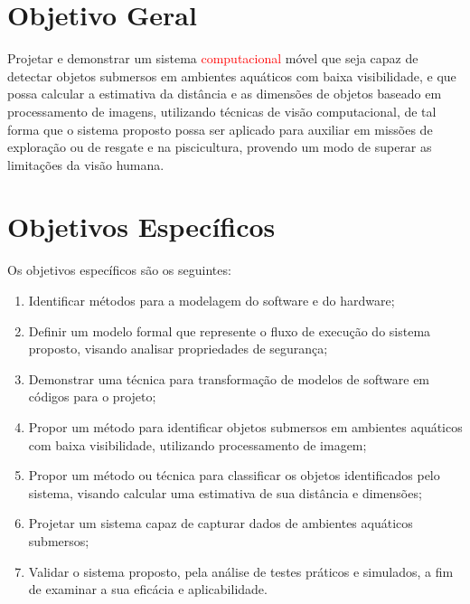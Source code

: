 

\section{Objetivo Geral}
Projetar e demonstrar um sistema \textcolor{red}{computacional} móvel que seja capaz de detectar objetos submersos em ambientes aquáticos com baixa visibilidade, e que possa calcular a estimativa da distância e as dimensões de objetos baseado em processamento de imagens, utilizando técnicas de visão computacional, de tal forma que o sistema proposto possa ser aplicado para auxiliar em missões de exploração ou de resgate e na piscicultura, provendo um modo de superar as limitações da visão humana.

\section{Objetivos Específicos}
Os objetivos específicos são os seguintes:
	\begin{enumerate}
		\item Identificar métodos para a modelagem do software e do hardware;

		\item Definir um modelo formal que represente o fluxo de execução do sistema proposto, visando analisar propriedades de segurança;

		\item Demonstrar uma técnica para transformação de modelos de software em códigos para o projeto;

		\item Propor um método para identificar objetos submersos em ambientes aquáticos com baixa visibilidade, utilizando processamento de imagem;

		\item Propor um método ou técnica para classificar os objetos identificados pelo sistema, visando calcular uma estimativa de sua distância e dimensões;

		\item Projetar um sistema capaz de capturar dados de ambientes aquáticos submersos;

		\item Validar o sistema proposto, pela análise de testes práticos e simulados, a fim de examinar a sua eficácia e aplicabilidade.

	\end{enumerate}
    

